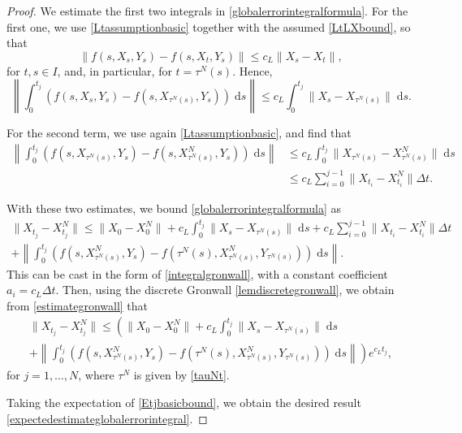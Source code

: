 \documentclass[reqno,12pt]{amsart}
\theoremstyle{plain} %
\theoremstyle{definition} %
\begin{document}
\begin{proof}
    We estimate the first two integrals in \cref{globalerrorintegralformula}. For the first one, we use \cref{Ltassumptionbasic} together with the assumed \cref{LtLXbound}, so that
    $$
        \|f(s, X_s, Y_s) - f(s, X_t, Y_s)\| \leq c_L \|X_s - X_t\|,
    $$
    for $t, s \in I$, and, in particular, for $t = \tau^N(s)$. Hence,
    $$
        \left\|\int_0^{t_j} \left( f(s, X_s, Y_s) - f(s, X_{\tau^N(s)}, Y_s) \right)\;\mathrm{d}s \right\| \leq c_L \int_0^{t_j} \|X_s - X_{\tau^N(s)}\| \;\mathrm{d}s.
    $$
    
    For the second term, we use again \cref{Ltassumptionbasic}, and find that
    \begin{align*}
        \left\|\int_0^{t_j} \left( f(s, X_{\tau^N(s)}, Y_s) - f(s, X_{\tau^N(s)}^N, Y_s) \right)\;\mathrm{d}s \right\| & \leq c_L \int_0^{t_j} \|X_{\tau^N(s)} - X_{\tau^N(s)}^N\| \;\mathrm{d}s \\
        & \leq c_L \sum_{i=0}^{j-1} \|X_{t_i} - X_{t_i}^N\| \Delta t.
    \end{align*}
    
    With these two estimates, we bound \cref{globalerrorintegralformula} as
    \begin{multline*}
        \|X_{t_j} - X_{t_j}^N\| \leq \|X_0 - X_0^N\| + c_L \int_0^{t_j} \|X_s - X_{\tau^N(s)}\| \;\mathrm{d}s + c_L \sum_{i=0}^{j-1} \|X_{t_i} - X_{t_i}^N\| \Delta t \\
        + \left\|\int_0^{t_j} \left( f(s, X_{\tau^N(s)}^N, Y_s) - f(\tau^N(s), X_{\tau^N(s)}^N, Y_{\tau^N(s)}) \right)\;\mathrm{d}s\right\|.
    \end{multline*}
    This can be cast in the form of \cref{integralgronwall}, with a constant coefficient $a_i = c_L \Delta t.$ Then, using the discrete Gronwall \cref{lemdiscretegronwall}, we obtain from \eqref{estimategronwall} that
    \begin{multline}
        \label{Etjbasicbound}
            \|X_{t_j} - X_{t_j}^N\| \leq \left( \|X_0 - X_0^N\| + c_L \int_0^{t_j} \|X_s - X_{\tau^N(s)}\| \;\mathrm{d}s \right. \\
            + \left. \left\|\int_0^{t_j} \left( f(s, X_{\tau^N(s)}^N, Y_s) - f(\tau^N(s), X_{\tau^N(s)}^N, Y_{\tau^N(s)}) \right)\;\mathrm{d}s\right\|\right) e^{c_L t_j},
    \end{multline}
    for $j=1, \ldots, N$, where $\tau^N$ is given by \cref{tauNt}.

    Taking the expectation of \cref{Etjbasicbound}, we obtain the desired result \cref{expectedestimateglobalerrorintegral}.
\end{proof}
\end{document}
